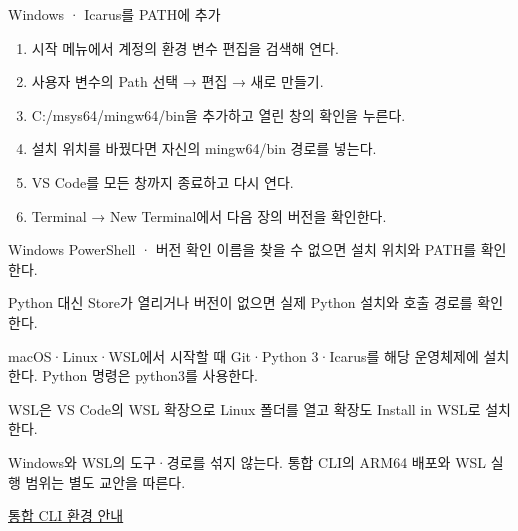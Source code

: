 \begin{frame}{Windows · Icarus를 PATH에 추가}\relax
\small
\begin{enumerate}\setlength{\itemsep}{0.22cm}
\item 시작 메뉴에서 계정의 환경 변수 편집을 검색해 연다.
\item 사용자 변수의 Path 선택 → 편집 → 새로 만들기.
\item C:/msys64/mingw64/bin을 추가하고 열린 창의 확인을 누른다.
\item 설치 위치를 바꿨다면 자신의 mingw64/bin 경로를 넣는다.
\item VS Code를 모든 창까지 종료하고 다시 연다.
\item Terminal → New Terminal에서 다음 장의 버전을 확인한다.
\end{enumerate}

\end{frame}

\begin{frame}{Windows PowerShell · 버전 확인}\relax
\small
{}
이름을 찾을 수 없으면 설치 위치와 PATH를 확인한다.\par\vspace{0.22cm}Python 대신 Store가 열리거나 버전이 없으면 실제 Python 설치와 호출 경로를 확인한다.\par
\end{frame}

\begin{frame}{macOS·Linux·WSL에서 시작할 때}\relax
\small
Git·Python 3·Icarus를 해당 운영체제에 설치한다. Python 명령은 python3를 사용한다.\par\vspace{0.22cm}WSL은 VS Code의 WSL 확장으로 Linux 폴더를 열고 확장도 Install in WSL로 설치한다.\par\vspace{0.22cm}Windows와 WSL의 도구·경로를 섞지 않는다. 통합 CLI의 ARM64 배포와 WSL 실행 범위는 별도 교안을 따른다.\par{}
\href{04.LAB1_10B_INTEGRATED_CLI.pdf}{통합 CLI 환경 안내}
\end{frame}

